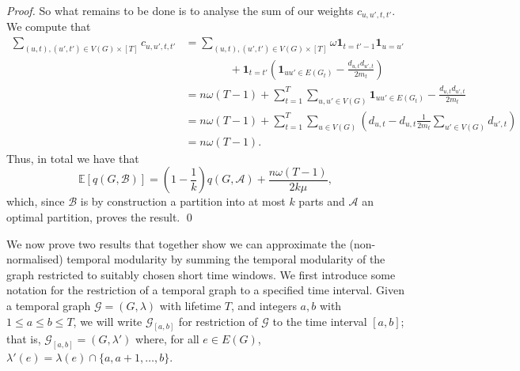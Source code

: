 \documentclass[runningheads]{llncs}
\newcommand{\cA}{\mathcal{A}}
\newcommand{\cG}{\mathcal{G}}
\newcommand{\BB}{\mathcal{B}}
\newcommand{\ind}[1]{\mathbf{1}_{#1}}
\newcommand{\Exp}[1]{\mathbb{E}\left[#1\right]}
\begin{document}
\begin{proof}
    So what remains to be done is to analyse the sum of our weights $c_{u,u',t,t'}$. We compute that
    \begin{align*}
        \sum_{(u,t),(u',t') \in V(G)\times [T]} c_{u,u',t,t'} &= \sum_{(u,t),(u',t') \in V(G)\times [T]} \omega\ind{t = t'-1}\ind{u = u'}\\
        &\qquad\qquad+ \ind{t = t'}\left(\ind{uu' \in E(G_t)} - \frac{d_{u,t} d_{u',t}}{2m_t}\right)\\
        &= n\omega(T-1) + \sum_{t=1}^T \sum_{u,u' \in V(G)} \ind{uu'\in E(G_t)} - \frac{d_{u,t} d_{u',t}}{2m_t}\\
        &= n\omega(T-1) + \sum_{t=1}^T \sum_{u\in V(G)} \left(d_{u,t} - d_{u,t}\frac{1}{2m_t}\sum_{u' \in V(G)} d_{u',t}\right)\\
        &= n\omega(T-1).
    \end{align*}
%
    Thus, in total we have that
    $$\Exp{q(G,\BB)} = \left(1 - \frac{1}{k}\right)q(G,\cA) + \frac{n\omega(T-1)}{2k\mu},$$
    which, since $\BB$ is by construction a partition into at most $k$ parts and $\cA$ an optimal partition, proves the result.
\qed
\end{proof}

We now prove two results that together show we can approximate the (non-normalised) temporal modularity by summing the temporal modularity of the graph restricted to suitably chosen short time windows.  We first introduce some notation for the restriction of a temporal graph to a specified time interval.  Given a temporal graph $\cG = (G,\lambda)$ with lifetime $T$, and integers $a,b$ with $1 \leq a \leq b \leq T$, we will write $\cG_{[a,b]}$ for restriction of $\cG$ to the time interval $[a,b]$; that is, $\cG_{[a,b]} = (G,\lambda')$ where, for all $e \in E(G)$, $\lambda'(e) = \lambda(e) \cap \{a,a+1,\dots,b\}$.
\end{document}
